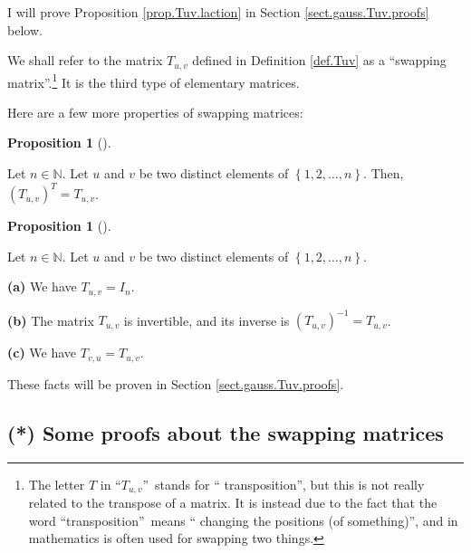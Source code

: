 \documentclass[numbers=enddot,12pt,final,onecolumn,notitlepage]{scrartcl}%
\theoremstyle{definition}
\newtheorem{prop}[theo]{Proposition}
\newenvironment{proposition}[1][]
{\begin{prop}[#1]\begin{leftbar}}
{\end{leftbar}\end{prop}}
\begin{document}
I will prove Proposition \ref{prop.Tuv.laction} in Section
\ref{sect.gauss.Tuv.proofs} below.

We shall refer to the matrix $T_{u,v}$ defined in Definition \ref{def.Tuv} as
a \textquotedblleft swapping matrix\textquotedblright.\footnote{The letter $T$
in \textquotedblleft$T_{u,v}$\textquotedblright\ stands for \textquotedblleft
transposition\textquotedblright, but this is not really related to the
transpose of a matrix. It is instead due to the fact that the word
\textquotedblleft transposition\textquotedblright\ means \textquotedblleft
changing the positions (of something)\textquotedblright, and in mathematics is
often used for swapping two things.} It is the third type of elementary matrices.

Here are a few more properties of swapping matrices:

\begin{proposition}
\label{prop.Tuv.transpose}Let $n\in\mathbb{N}$. Let $u$ and $v$ be two
distinct elements of $\left\{  1,2,\ldots,n\right\}  $. Then, $\left(
T_{u,v}\right)  ^{T}=T_{u,v}$.
\end{proposition}

\begin{proposition}
\label{prop.Tuv.lambda+mu}Let $n\in\mathbb{N}$. Let $u$ and $v$ be two
distinct elements of $\left\{  1,2,\ldots,n\right\}  $.

\textbf{(a)} We have $T_{u,v}=I_{n}$.

\textbf{(b)} The matrix $T_{u,v}$ is invertible, and its inverse is $\left(
T_{u,v}\right)  ^{-1}=T_{u,v}$.

\textbf{(c)} We have $T_{v,u}=T_{u,v}$.
\end{proposition}

These facts will be proven in Section \ref{sect.gauss.Tuv.proofs}.

\subsection{\label{sect.gauss.Tuv.proofs}(*) Some proofs about the swapping
matrices}
\end{document}

